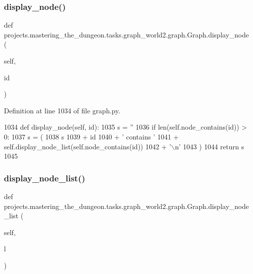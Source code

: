 \subsubsection{\texorpdfstring{display\+\_\+node()}{display\_node()}}
{\footnotesize\ttfamily def projects.\+mastering\+\_\+the\+\_\+dungeon.\+tasks.\+graph\+\_\+world2.\+graph.\+Graph.\+display\+\_\+node (\begin{DoxyParamCaption}\item[{}]{self,  }\item[{}]{id }\end{DoxyParamCaption})}



Definition at line 1034 of file graph.\+py.


\begin{DoxyCode}
1034     \textcolor{keyword}{def }display\_node(self, id):
1035         s = \textcolor{stringliteral}{''}
1036         \textcolor{keywordflow}{if} len(self.node\_contains(id)) > 0:
1037             s = (
1038                 s
1039                 + id
1040                 + \textcolor{stringliteral}{' contains '}
1041                 + self.display\_node\_list(self.node\_contains(id))
1042                 + \textcolor{stringliteral}{'\(\backslash\)n'}
1043             )
1044         \textcolor{keywordflow}{return} s
1045 
\end{DoxyCode}
\mbox{\label{classprojects_1_1mastering__the__dungeon_1_1tasks_1_1graph__world2_1_1graph_1_1Graph_ad4765421393cb14a6084a9d98dd530a0}} 
\subsubsection{\texorpdfstring{display\+\_\+node\+\_\+list()}{display\_node\_list()}}
{\footnotesize\ttfamily def projects.\+mastering\+\_\+the\+\_\+dungeon.\+tasks.\+graph\+\_\+world2.\+graph.\+Graph.\+display\+\_\+node\+\_\+list (\begin{DoxyParamCaption}\item[{}]{self,  }\item[{}]{l }\end{DoxyParamCaption})}



